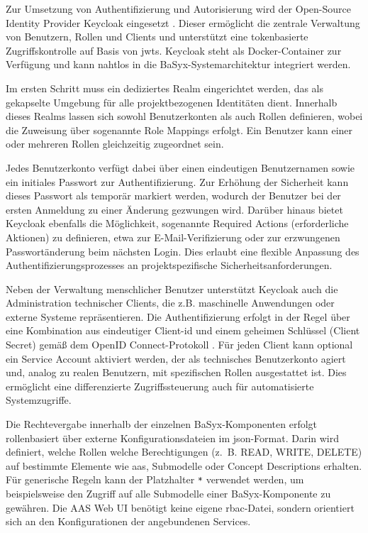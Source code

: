 Zur Umsetzung von Authentifizierung und Autorisierung wird der Open-Source Identity Provider Keycloak eingesetzt \cite{Keycloak}.  
Dieser ermöglicht die zentrale Verwaltung von Benutzern, Rollen und Clients und unterstützt eine tokenbasierte Zugriffskontrolle auf Basis von \acsp{jwt}.  
Keycloak steht als Docker-Container zur Verfügung und kann nahtlos in die BaSyx-Systemarchitektur integriert werden.

Im ersten Schritt muss ein dediziertes Realm eingerichtet werden, das als gekapselte Umgebung für alle projektbezogenen Identitäten dient.  
Innerhalb dieses Realms lassen sich sowohl Benutzerkonten als auch Rollen definieren, wobei die Zuweisung über sogenannte Role Mappings erfolgt.  
Ein Benutzer kann einer oder mehreren Rollen gleichzeitig zugeordnet sein.

Jedes Benutzerkonto verfügt dabei über einen eindeutigen Benutzernamen sowie ein ini\-tiales Passwort zur Authentifizierung.  
Zur Erhöhung der Sicherheit kann dieses Passwort als temporär markiert werden, wodurch der Benutzer bei der ersten Anmeldung zu einer Änderung gezwungen wird.  
Darüber hinaus bietet Keycloak ebenfalls die Möglichkeit, sogenannte Required Actions (erforderliche Aktionen) zu definieren, etwa zur E-Mail-Verifizierung oder zur erzwungenen Passwortänderung beim nächsten Login.  
Dies erlaubt eine flexible Anpassung des Authentifizierungsprozesses an projektspezifische Sicherheitsanforderungen.

Neben der Verwaltung menschlicher Benutzer unterstützt Keycloak auch die Administration technischer Clients, die z.B. maschinelle Anwendungen oder externe Systeme repräsentieren.  
Die Authentifizierung erfolgt in der Regel über eine Kombination aus eindeutiger Client-\acs{id} und einem geheimen Schlüssel (Client Secret) gemäß dem OpenID Connect-Protokoll \cite{OpenID}.  
Für jeden Client kann optional ein Service Account aktiviert werden, der als technisches Benutzerkonto agiert und, analog zu realen Benutzern, mit spezifischen Rollen ausgestattet ist.  
Dies ermöglicht eine differenzierte Zugriffssteuerung auch für automatisierte Systemzugriffe.

Die Rechtevergabe innerhalb der einzelnen BaSyx-Komponenten erfolgt rollenbasiert über externe Konfigurationsdateien im \acs{json}-Format.  
Darin wird definiert, welche Rollen welche Berechtigungen (z.~B. READ, WRITE, DELETE) auf bestimmte Elemente wie \acs{aas}, Submodelle oder Concept Descriptions erhalten.  
Für generische Regeln kann der Platzhalter \texttt{*} verwendet werden, um beispielsweise den Zugriff auf alle Submodelle einer BaSyx-Komponente zu gewähren.  
Die AAS Web UI benötigt keine eigene \acs{rbac}-Datei, sondern orientiert sich an den Konfigurationen der angebundenen Services.

